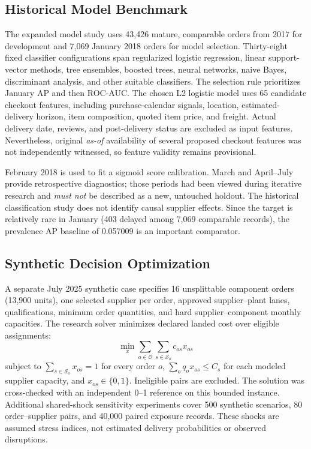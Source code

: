 \documentclass[conference,a4paper]{IEEEtran}
\begin{document}
\subsection{Historical Model Benchmark}
The expanded model study uses 43,426 mature, comparable orders from 2017 for development and 7,069 January 2018 orders for model selection. Thirty-eight fixed classifier configurations span regularized logistic regression, linear support-vector methods, tree ensembles, boosted trees, neural networks, naive Bayes, discriminant analysis, and other suitable classifiers. The selection rule prioritizes January AP and then ROC-AUC. The chosen L2 logistic model uses 65 candidate checkout features, including purchase-calendar signals, location, estimated-delivery horizon, item composition, quoted item price, and freight. Actual delivery date, reviews, and post-delivery status are excluded as input features. Nevertheless, original \emph{as-of} availability of several proposed checkout features was not independently witnessed, so feature validity remains provisional.

February 2018 is used to fit a sigmoid score calibration. March and April--July provide retrospective diagnostics; those periods had been viewed during iterative research and \emph{must not} be described as a new, untouched holdout. The historical classification study does not identify causal supplier effects. Since the target is relatively rare in January (403 delayed among 7,069 comparable records), the prevalence AP baseline of 0.057009 is an important comparator.

\subsection{Synthetic Decision Optimization}
A separate July 2025 synthetic case specifies 16 unsplittable component orders (13,900 units), one selected supplier per order, approved supplier--plant lanes, qualifications, minimum order quantities, and hard supplier--component monthly capacities. The research solver minimizes declared landed cost over eligible assignments:
\begin{equation}
\min_{x} \sum_{o\in\mathcal O}\sum_{s\in\mathcal S_o}c_{os}x_{os}
\end{equation}
subject to $\sum_{s\in\mathcal S_o}x_{os}=1$ for every order $o$, $\sum_o q_o x_{os}\leq C_s$ for each modeled supplier capacity, and $x_{os}\in\{0,1\}$. Ineligible pairs are excluded. The solution was cross-checked with an independent 0--1 reference on this bounded instance. Additional shared-shock sensitivity experiments cover 500 synthetic scenarios, 80 order--supplier pairs, and 40,000 paired exposure records. These shocks are assumed stress indices, not estimated delivery probabilities or observed disruptions.
\end{document}
